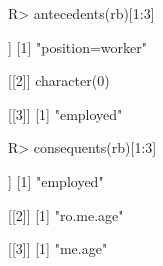 \begin{Schunk}
% --begin: "searchrules4"
\begin{Sinput}
R> antecedents(rb)[1:3]
\end{Sinput}
\begin{Soutput}
[[1]]
[1] "position=worker"

[[2]]
character(0)

[[3]]
[1] "employed"
\end{Soutput}
\begin{Sinput}
R> consequents(rb)[1:3]
\end{Sinput}
\begin{Soutput}
[[1]]
[1] "employed"

[[2]]
[1] "ro.me.age"

[[3]]
[1] "me.age"
\end{Soutput}
%
% --end: "searchrules4"
\end{Schunk}
